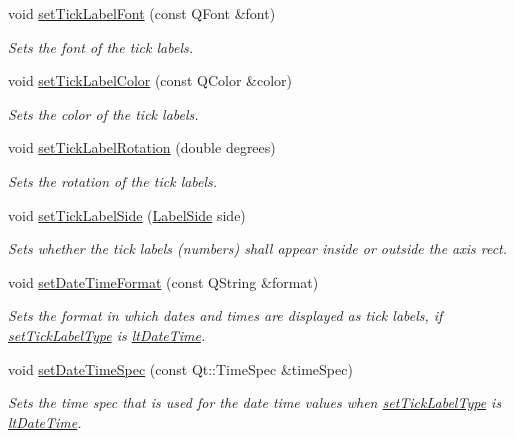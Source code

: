 \begin{DoxyCompactItemize}
void \hyperlink{classQCPAxis_a2b8690c4e8dbc39d9185d2b398ce7a6c}{set\+Tick\+Label\+Font} (const Q\+Font \&font)
\begin{DoxyCompactList}\small\item\em Sets the font of the tick labels. \end{DoxyCompactList}\item 
void \hyperlink{classQCPAxis_a395e445c3fe496b935bee7b911ecfd1c}{set\+Tick\+Label\+Color} (const Q\+Color \&color)
\begin{DoxyCompactList}\small\item\em Sets the color of the tick labels. \end{DoxyCompactList}\item 
void \hyperlink{classQCPAxis_a1bddd4413df8a576b7ad4b067fb33375}{set\+Tick\+Label\+Rotation} (double degrees)
\begin{DoxyCompactList}\small\item\em Sets the rotation of the tick labels. \end{DoxyCompactList}\item 
void \hyperlink{classQCPAxis_a13ec644fc6e22715744c92c6dfa4f0fa}{set\+Tick\+Label\+Side} (\hyperlink{classQCPAxis_a24b13374b9b8f75f47eed2ea78c37db9}{Label\+Side} side)
\begin{DoxyCompactList}\small\item\em Sets whether the tick labels (numbers) shall appear inside or outside the axis rect. \end{DoxyCompactList}\item 
void \hyperlink{classQCPAxis_a2ee0191daa03524a682113e63e05f7a7}{set\+Date\+Time\+Format} (const Q\+String \&format)
\begin{DoxyCompactList}\small\item\em Sets the format in which dates and times are displayed as tick labels, if \hyperlink{classQCPAxis_a54f24f5ce8feea25209388a863d7e448}{set\+Tick\+Label\+Type} is \hyperlink{classQCPAxis_a4a7da0166f755f5abac23b765d184cadafc70594a9d877124dd11ccc187d4ac52}{lt\+Date\+Time}. \end{DoxyCompactList}\item 
void \hyperlink{classQCPAxis_a262e06731debed7eee11fa6a81d67eaf}{set\+Date\+Time\+Spec} (const Qt\+::\+Time\+Spec \&time\+Spec)
\begin{DoxyCompactList}\small\item\em Sets the time spec that is used for the date time values when \hyperlink{classQCPAxis_a54f24f5ce8feea25209388a863d7e448}{set\+Tick\+Label\+Type} is \hyperlink{classQCPAxis_a4a7da0166f755f5abac23b765d184cadafc70594a9d877124dd11ccc187d4ac52}{lt\+Date\+Time}. \end{DoxyCompactList}\item 

\end{DoxyCompactItemize}
